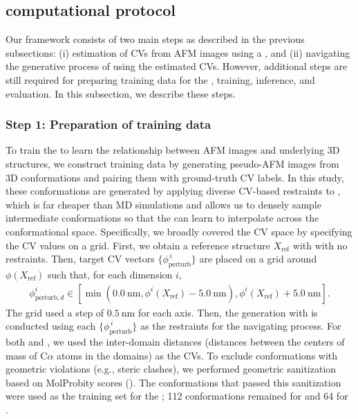 \subsection{\Model computational protocol}
\label{subsec:protocol}

Our \Model framework consists of two main steps as described in the previous subsections: (i) estimation of CVs from AFM images using a \gcnn, and (ii) navigating the generative process of \AFiii using the estimated CVs. However, additional steps are still required for preparing training data for the \gcnn, training, inference, and evaluation. In this subsection, we describe these steps.

\subsubsection{Step 1: Preparation of training data}

To train the \gcnn to learn the relationship between AFM images and underlying 3D structures, we construct training data by generating pseudo-AFM images from 3D conformations and pairing them with ground-truth CV labels. 
In this study, these conformations are generated by applying diverse CV-based restraints to \AFiii, which is far cheaper than MD simulations and allows us to densely sample intermediate conformations so that the \gcnn can learn to interpolate across the conformational space.
Specifically, we broadly covered the CV space by specifying the CV values on a grid.
First, we obtain a reference structure $X_{\text{ref}}$ with \AFiii with no restraints.
Then, target CV vectors $\{\phi_{\text{perturb}}^{\,i}\}$ are placed on a grid around $\phi(X_{\text{ref}})$ such that, for each dimension $i$,
\begin{equation}
    \begin{split}
    \phi_{\text{perturb},d}^i \in \left[ \min(0.0~\mathrm{nm}, \phi^i(X_{\text{ref}}) - 5.0~\mathrm{nm}), \phi^i(X_{\text{ref}}) + 5.0~\mathrm{nm} \right].
    \label{eq:target_domain_distance}
    \end{split}
\end{equation}
The grid used a step of $0.5~\mathrm{nm}$ for each axis. Then, the generation with \AFiii is conducted using each $\{\phi_{\text{perturb}}^{\,i}\}$ as the restraints for the navigating process.
For both \AK and \flhac, we used the inter-domain distances (distances between the centers of mass of C$\alpha$ atoms in the domains) as the CVs.
To exclude conformations with geometric violations (e.g., steric clashes), we performed geometric sanitization based on MolProbity scores (). 
The conformations that passed this sanitization were used as the training set for the \gcnn; 112 conformations remained for \AK and 64 for \flhac.

